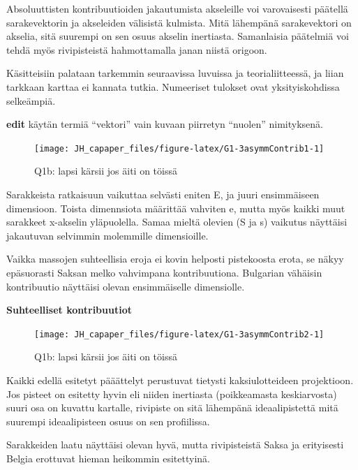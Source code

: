 \documentclass[
  finnish,
]{book}
\begin{document}
Absoluuttisten kontribuutioiden jakautumista akseleille voi varovaisesti päätellä
sarakevektorin ja akseleiden välisistä kulmista. Mitä lähempänä sarakevektori on akselia,
sitä suurempi on sen osuus akselin inertiasta. Samanlaisia päätelmiä voi tehdä myös
rivipisteistä hahmottamalla janan niistä origoon.

Käsitteisiin palataan tarkemmin seuraavissa luvuissa ja teorialiitteessä, ja liian
tarkkaan karttaa ei kannata tutkia. Numeeriset tulokset ovat yksityiskohdissa selkeämpiä.

\textbf{edit} käytän termiä ``vektori'' vain kuvaan piirretyn ``nuolen'' nimityksenä.

\begin{figure}

{\centering \texttt{[image: JH\_capaper\_files/figure-latex/G1-3asymmContrib1-1]} 

}

\caption{Q1b: lapsi kärsii jos äiti on töissä}\label{fig:G1-3asymmContrib1}
\end{figure}

Sarakkeista ratkaisuun vaikuttaa selvästi eniten E, ja juuri ensimmäiseen
dimensioon. Toista dimennsiota määrittää vahviten e, mutta myös kaikki muut
sarakkeet x-akselin yläpuolella. Samaa mieltä olevien (S ja s) vaikutus näyttäisi
jakautuvan selvimmin molemmille dimensioille.

Vaikka massojen suhteellisia eroja ei kovin helposti pistekoosta erota, se näkyy
epäsuorasti Saksan melko vahvimpana kontribuutiona. Bulgarian vähäisin kontribuutio
näyttäisi olevan ensimmäiselle dimensiolle.

\textbf{Suhteelliset kontribuutiot}

\begin{figure}

{\centering \texttt{[image: JH\_capaper\_files/figure-latex/G1-3asymmContrib2-1]} 

}

\caption{Q1b: lapsi kärsii jos äiti on töissä}\label{fig:G1-3asymmContrib2}
\end{figure}

Kaikki edellä esitetyt pääättelyt perustuvat tietysti kaksiulotteideen projektioon.
Jos pisteet on esitetty hyvin eli niiden inertiasta (poikkeamasta keskiarvosta)
suuri osa on kuvattu kartalle, rivipiste on sitä lähempänä ideaalipistettä mitä
suurempi ideaalipisteen osuus on sen profiilissa.

Sarakkeiden laatu näyttäisi olevan hyvä, mutta rivipisteistä Saksa ja erityisesti
Belgia erottuvat hieman heikommin esitettyinä.
\end{document}
